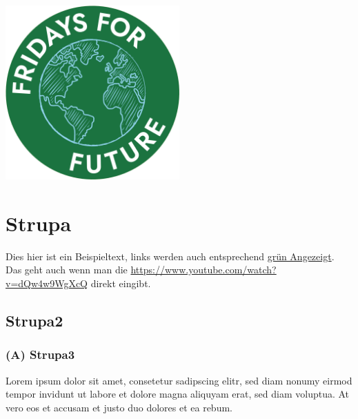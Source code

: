 \documentclass[a4paper,
  ]{scrartcl}
\begin{document}
\begin{center}
  \includegraphics[width=0.5\textwidth]{Logo.png}
\end{center}




\tableofcontents

\section{Strupa}
Dies hier ist ein Beispieltext, links werden auch entsprechend \href{https://www.youtube.com/watch?v=dQw4w9WgXcQ}{grün Angezeigt}. Das geht auch wenn man die \url{https://www.youtube.com/watch?v=dQw4w9WgXcQ} direkt eingibt.
\subsection{Strupa2}
\subsubsection*{ (A) Strupa3}
Lorem ipsum dolor sit amet, consetetur sadipscing elitr, sed diam nonumy eirmod tempor invidunt ut labore et dolore magna aliquyam erat, sed diam voluptua. At vero eos et accusam et justo duo dolores et ea rebum.
\end{document}
